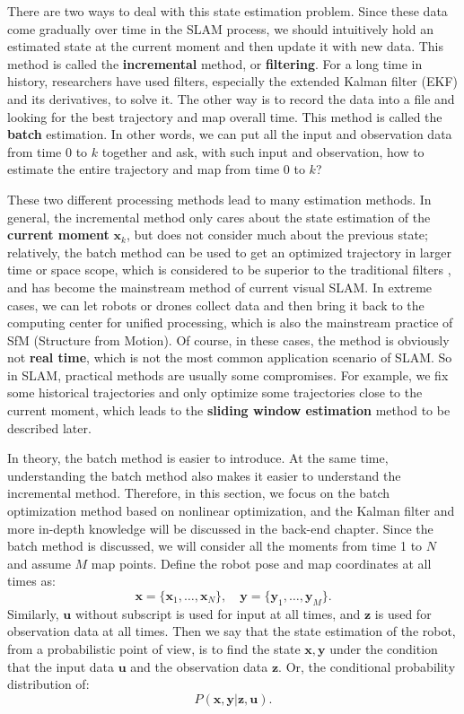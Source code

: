 There are two ways to deal with this state estimation problem. Since these data come gradually over time in the SLAM process, we should intuitively hold an estimated state at the current moment and then update it with new data. This method is called the \textbf {incremental} method, or \textbf{filtering}. For a long time in history, researchers have used filters, especially the extended Kalman filter (EKF) and its derivatives, to solve it. The other way is to record the data into a file and looking for the best trajectory and map overall time. This method is called the \textbf {batch} estimation. In other words, we can put all the input and observation data from time 0 to $ k $ together and ask, with such input and observation, how to estimate the entire trajectory and map from time 0 to $ k $?

These two different processing methods lead to many estimation methods. In general, the incremental method only cares about the state estimation of the \textbf {current moment} $ \bm {x} _k $, but does not consider much about the previous state; relatively, the batch method can be used to get an optimized trajectory in larger time or space scope, which is considered to be superior to the traditional filters \textsuperscript {\cite {Strasdat2012}}, and has become the mainstream method of current visual SLAM. In extreme cases, we can let robots or drones collect data and then bring it back to the computing center for unified processing, which is also the mainstream practice of SfM (Structure from Motion). Of course, in these cases, the method is obviously not \textbf {real time}, which is not the most common application scenario of SLAM. So in SLAM, practical methods are usually some compromises. For example, we fix some historical trajectories and only optimize some trajectories close to the current moment, which leads to the \textbf {sliding window estimation} method to be described later.

In theory, the batch method is easier to introduce. At the same time, understanding the batch method also makes it easier to understand the incremental method. Therefore, in this section, we focus on the batch optimization method based on nonlinear optimization, and the Kalman filter and more in-depth knowledge will be discussed in the back-end chapter. Since the batch method is discussed, we will consider all the moments from time 1 to $N$ and assume $M$ map points. Define the robot pose and map coordinates at all times as:
\[
\bm{x}=\{ \bm{x}_1, \ldots, \bm{x}_N \}, \quad \bm{y} = \{\bm{y}_1, \ldots, \bm{y}_M \}.
\]
Similarly, $ \bm {u} $ without subscript is used for input at all times, and $ \bm {z} $ is used for observation data at all times. Then we say that the state estimation of the robot, from a probabilistic point of view, is to find the state $ \bm {x}, \bm{y}$ under the condition that the input data $ \bm {u} $ and the observation data $\bm{z} $. Or, the conditional probability distribution of:
\begin{equation}
P( \bm{x},\bm{y} | \bm{z}, \bm{u}).
\end{equation}

